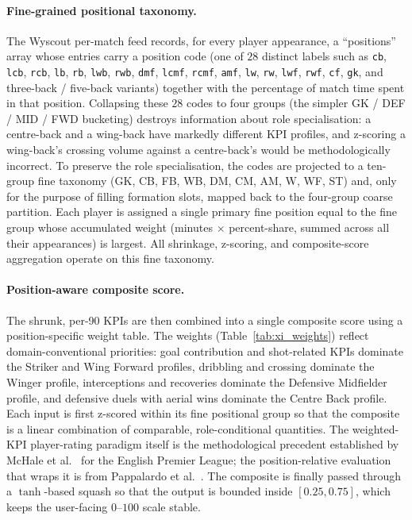 \paragraph{Fine-grained positional taxonomy.}
The Wyscout per-match feed records, for every player appearance, a ``positions'' array whose entries carry a position code (one of $28$ distinct labels such as \texttt{cb}, \texttt{lcb}, \texttt{rcb}, \texttt{lb}, \texttt{rb}, \texttt{lwb}, \texttt{rwb}, \texttt{dmf}, \texttt{lcmf}, \texttt{rcmf}, \texttt{amf}, \texttt{lw}, \texttt{rw}, \texttt{lwf}, \texttt{rwf}, \texttt{cf}, \texttt{gk}, and three-back / five-back variants) together with the percentage of match time spent in that position. Collapsing these $28$ codes to four groups (the simpler GK / DEF / MID / FWD bucketing) destroys information about role specialisation: a centre-back and a wing-back have markedly different KPI profiles, and z-scoring a wing-back's crossing volume against a centre-back's would be methodologically incorrect. To preserve the role specialisation, the codes are projected to a ten-group fine taxonomy (GK, CB, FB, WB, DM, CM, AM, W, WF, ST) and, only for the purpose of filling formation slots, mapped back to the four-group coarse partition. Each player is assigned a single primary fine position equal to the fine group whose accumulated weight (minutes $\times$ percent-share, summed across all their appearances) is largest. All shrinkage, z-scoring, and composite-score aggregation operate on this fine taxonomy.

\paragraph{Position-aware composite score.}
The shrunk, per-90 KPIs are then combined into a single composite score using a position-specific weight table. The weights (Table~\ref{tab:xi_weights}) reflect domain-conventional priorities: goal contribution and shot-related KPIs dominate the Striker and Wing Forward profiles, dribbling and crossing dominate the Winger profile, interceptions and recoveries dominate the Defensive Midfielder profile, and defensive duels with aerial wins dominate the Centre Back profile. Each input is first z-scored within its fine positional group so that the composite is a linear combination of comparable, role-conditional quantities. The weighted-KPI player-rating paradigm itself is the methodological precedent established by McHale et al.~\cite{mchale2012interfaces} for the English Premier League; the position-relative evaluation that wraps it is from Pappalardo et al.~\cite{pappalardo2019playerank}. The composite is finally passed through a $\tanh$-based squash so that the output is bounded inside $[0.25, 0.75]$, which keeps the user-facing $0$--$100$ scale stable.

